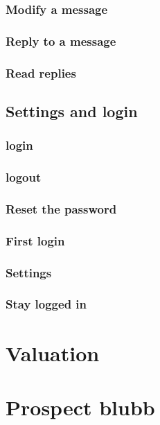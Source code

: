 \documentclass[12pt,a4paper,oneside]{report}
\begin{document}
\subsection{Modify a message}

\subsection{Reply to a message}

\subsection{Read replies}

\section{Settings and login}

\subsection{login}

\subsection{logout}

\subsection{Reset the password}

\subsection{First login}

\subsection{Settings}

\subsection{Stay logged in}

\chapter{Valuation}

\chapter{Prospect blubb}
\end{document}
